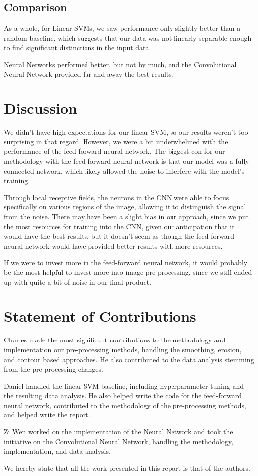 \documentclass[conference]{IEEEtran}
\begin{document}
\subsection{Comparison}

As a whole, for Linear SVMs, we saw performance only slightly better than a random baseline, which suggests that our data was not linearly separable enough to find significant distinctions in the input data.

Neural Networks performed better, but not by much, and the Convolutional Neural Network provided far and away the best results.

\section{\textbf{Discussion}}

We didn't have high expectations for our linear SVM, so our results weren't too surprising in that regard. However, we were a bit underwhelmed with the performance of the feed-forward neural network. The biggest con for our methodology with the feed-forward neural network is that our model was a fully-connected network, which likely allowed the noise to interfere with the model's training.

Through local receptive fields, the neurons in the CNN were able to focus specifically on various regions of the image, allowing it to distinguish the signal from the noise. There may have been a slight bias in our approach, since we put the most resources for training into the CNN, given our anticipation that it would have the best results, but it doesn't seem as though the feed-forward neural network would have provided better results with more resources.

If we were to invest more in the feed-forward neural network, it would probably be the most helpful to invest more into image pre-processing, since we still ended up with quite a bit of noise in our final product.

\section{\textbf{Statement of Contributions}}

Charles made the most significant contributions to the methodology and implementation our pre-processing methods, handling the smoothing, erosion, and contour based approaches. He also contributed to the data analysis stemming from the pre-processing changes.

Daniel handled the linear SVM baseline, including hyperparameter tuning and the resulting data analysis. He also helped write the code for the feed-forward neural network, contributed to the methodology of the pre-processing methods, and helped write the report.

Zi Wen worked on the implementation of the Neural Network and took the initiative on the Convolutional Neural Network, handling the methodology, implementation, and data analysis.

We hereby state that all the work presented in this report is that of the authors. 
\end{document}
